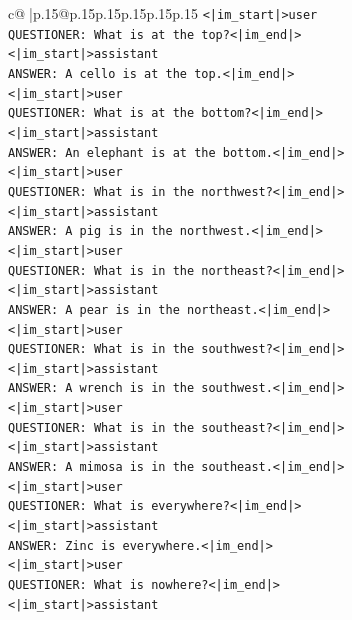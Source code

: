 \documentclass{article}
\begin{document}
{\begin{supertabular}{c@{$\;$}|p{.15\linewidth}@{}p{.15\linewidth}p{.15\linewidth}p{.15\linewidth}p{.15\linewidth}p{.15\linewidth}}
{{{\texttt{<|im\_start|>user} \\
\texttt{QUESTIONER: What is at the top?<|im\_end|>} \\
\texttt{<|im\_start|>assistant} \\
\texttt{ANSWER: A cello is at the top.<|im\_end|>} \\
\texttt{<|im\_start|>user} \\
\texttt{QUESTIONER: What is at the bottom?<|im\_end|>} \\
\texttt{<|im\_start|>assistant} \\
\texttt{ANSWER: An elephant is at the bottom.<|im\_end|>} \\
\texttt{<|im\_start|>user} \\
\texttt{QUESTIONER: What is in the northwest?<|im\_end|>} \\
\texttt{<|im\_start|>assistant} \\
\texttt{ANSWER: A pig is in the northwest.<|im\_end|>} \\
\texttt{<|im\_start|>user} \\
\texttt{QUESTIONER: What is in the northeast?<|im\_end|>} \\
\texttt{<|im\_start|>assistant} \\
\texttt{ANSWER: A pear is in the northeast.<|im\_end|>} \\
\texttt{<|im\_start|>user} \\
\texttt{QUESTIONER: What is in the southwest?<|im\_end|>} \\
\texttt{<|im\_start|>assistant} \\
\texttt{ANSWER: A wrench is in the southwest.<|im\_end|>} \\
\texttt{<|im\_start|>user} \\
\texttt{QUESTIONER: What is in the southeast?<|im\_end|>} \\
\texttt{<|im\_start|>assistant} \\
\texttt{ANSWER: A mimosa is in the southeast.<|im\_end|>} \\
\texttt{<|im\_start|>user} \\
\texttt{QUESTIONER: What is everywhere?<|im\_end|>} \\
\texttt{<|im\_start|>assistant} \\
\texttt{ANSWER: Zinc is everywhere.<|im\_end|>} \\
\texttt{<|im\_start|>user} \\
\texttt{QUESTIONER: What is nowhere?<|im\_end|>} \\
\texttt{<|im\_start|>assistant} \\
}}}
\end{supertabular}}
\end{document}
